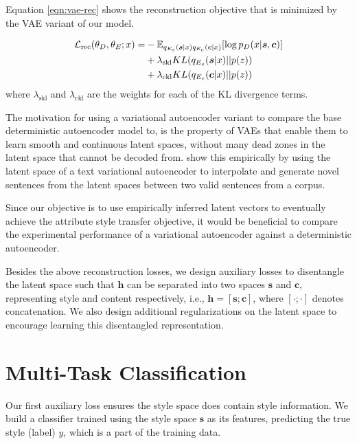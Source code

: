 Equation \ref{eqn:vae-rec} shows the reconstruction objective that is minimized by the VAE variant of our model.

\begin{align} \label{eqn:vae-rec}
	\mathcal{L}_\text{rec}(\theta_D, \theta_E; x) = \nonumber
	 & - \mathbb{E}_{q_{E_s}(\bm s|x) q_{E_c}(\bm c|x)} [\log p_D(x|\bm s, \bm c)] \nonumber \\
	 & + \lambda_{\text{skl}} KL(q_{E_s}(\bm s|x)||p(z)) \nonumber                           \\
	 & + \lambda_{\text{ckl}} KL(q_{E_c}(\bm c|x)||p(z))
\end{align}
where $\lambda_{\text{skl}}$ and $\lambda_{\text{ckl}}$ are the weights for each of the KL divergence terms.

The motivation for using a variational autoencoder variant to compare the base deterministic autoencoder model to, is the property of VAEs that enable them to learn smooth and continuous latent spaces, without many dead zones in the latent space that cannot be decoded from. \cite{bowman2016generating} show this empirically by using the latent space of a text variational autoencoder to interpolate and generate novel sentences from the latent spaces between two valid sentences from a corpus.

Since our objective is to use empirically inferred latent vectors to eventually achieve the attribute style transfer objective, it would be beneficial to compare the experimental performance of a variational autoencoder against a deterministic autoencoder.


Besides the above reconstruction losses, we design auxiliary losses to disentangle the latent space such that $\bm h$ can be separated into two spaces $\bm s$ and $\bm c$, representing style and content respectively, i.e., $\bm h = [\bm s ; \bm c]$, where $[\cdot;\cdot]$ denotes concatenation. We also design additional regularizations on the latent space to encourage learning this disentangled representation.


\section{Multi-Task Classification} \label{sec:multitask-classification-objective}

Our first auxiliary loss ensures the style space does contain style information. We build a classifier trained using the style space $\bm s$ as its features, predicting the true style (label) $y$, which is a part of the training data.

